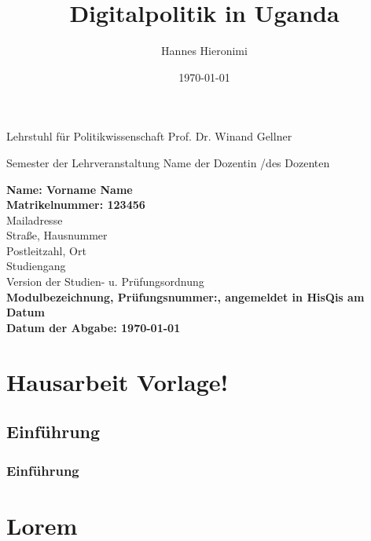 \documentclass{Hausarbeit}
\title{Digitalpolitik in Uganda}
\author{Hannes Hieronimi}
\date{\today}
\begin{document}
\begin{titlepage}

        {Lehrstuhl für Politikwissenschaft}
        {Prof. Dr. Winand Gellner}

    \vspace{4cm}

        {Semester der Lehrveranstaltung}
        {Name der Dozentin /des Dozenten}


    \vspace*{\fill}

    \begin{flushleft}
        \textbf{Name: Vorname Name}\\
        \textbf{Matrikelnummer: 123456}\\[0.5cm]
        Mailadresse\\
        Straße, Hausnummer\\
        Postleitzahl, Ort\\[0.5cm]
        Studiengang\\
        Version der Studien- u. Prüfungsordnung\\[2cm]
        \textbf{Modulbezeichnung, Prüfungsnummer:, angemeldet in HisQis am Datum}\\
        \textbf{Datum der Abgabe: \today}
    \end{flushleft}


\end{titlepage}



    

    \section{Hausarbeit Vorlage!}
    \subsection{Einführung}
    \subsubsection{Einführung}

    \blindtext
    
    \blindtext

    \blindtext

    \newpage

    \section{Lorem}

    \blindtext
    
    \blindtext

    \blindtext
\end{document}
